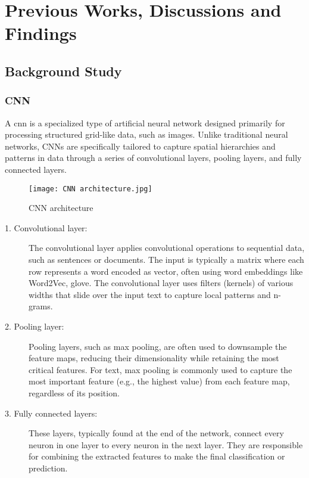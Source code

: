 \chapter{Previous Works, Discussions and Findings}

\section{Background Study}

\subsection{CNN}

A \ac{cnn} is a specialized type of artificial neural network designed primarily for processing structured grid-like data, such as images. Unlike traditional neural networks, CNNs are specifically tailored to capture spatial hierarchies and patterns in data through a series of convolutional layers, pooling layers, and fully connected layers.

\begin{figure}[h]
    \centering
    \texttt{[image: CNN architecture.jpg]}
    \caption{CNN architecture}
    \label{fig:cnn artchitecture}
\end{figure}

\begin{description}

    \item[1. Convolutional layer:] The convolutional layer applies convolutional operations to sequential data, such as sentences or documents. The input is typically a matrix where each row represents a word encoded as vector, often using word embeddings like Word2Vec, \ac{glove}. The convolutional layer uses filters (kernels) of various widths that slide over the input text to capture local patterns and n-grams.

    \item[2. Pooling layer:] Pooling layers, such as max pooling, are often used to downsample the feature maps, reducing their dimensionality while retaining the most critical features. For text, max pooling is commonly used to capture the most important feature (e.g., the highest value) from each feature map, regardless of its position.
   
    \item[3. Fully connected layers:] These layers, typically found at the end of the network, connect every neuron in one layer to every neuron in the next layer. They are responsible for combining the extracted features to make the final classification or prediction.
       
\end{description}

